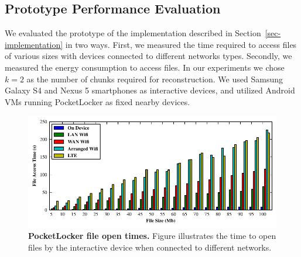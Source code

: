 \subsection{Prototype Performance Evaluation}
\label{subsec-performance-evaluation}

We evaluated the prototype of the implementation described in
Section~\ref{sec-implementation} in two ways. First, we measured the time
required to access files of various sizes with devices connected to different
networks types. Secondly, we measured the energy consumption to access files.
In our experiments we chose $k=2$ as the number of chunks required for
reconstruction. We used Samsung Galaxy S4 and Nexus 5 smartphones as
interactive devices, and utilized Android VMs running PocketLocker as fixed
nearby devices.

\begin{figure}[t]
  \centering
  \includegraphics{./figures/downloadtimes.pdf}
  
  \vspace*{-0.1in}

  \caption{\small \textbf{PocketLocker file open times.} Figure
    illustrates the time to open files by the interactive device when
      connected to different networks.}

  \label{fig-evaluation-download}
  
  \vspace*{0.05in}


  \vspace*{-0.2in}

\end{figure}
